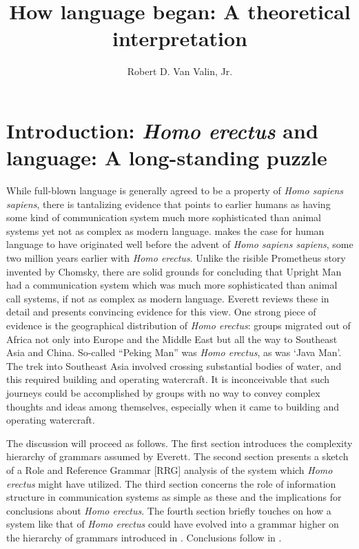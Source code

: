 \documentclass[output=paper,colorlinks,citecolor=brown]{langscibook}
\author{Robert D. Van Valin, Jr.\orcid{}\affiliation{The State University of New York at Buffalo \& Heinrich Heine University Düsseldorf}}
\title{How language began: A theoretical interpretation}
\begin{document}
\maketitle

\section{Introduction: \emph{Homo erectus} and language: A long-standing puzzle}
While full-blown language is generally agreed to be a property of \emph{Homo sapiens sapiens}, there is tantalizing evidence that points to earlier humans as having some kind of communication system much more sophisticated than animal systems yet not as complex as modern language. \citet{everett2017language} makes the case for human language to have originated well before the advent of \emph{Homo sapiens sapiens}, some two million years earlier with \emph{Homo erectus}. Unlike the risible Prometheus story invented by Chomsky, there are solid grounds for concluding that Upright Man had a communication system which was much more sophisticated than animal call systems, if not as complex as modern language.  Everett reviews these in detail and presents convincing evidence for this view.  One strong piece of evidence is the geographical distribution of \emph{Homo erectus}: groups migrated out of Africa not only into Europe and the Middle East but all the way to Southeast Asia and China.  So-called “Peking Man” was \emph{Homo erectus}, as was ‘Java Man’.  The trek into Southeast Asia involved crossing substantial bodies of water, and this required building and operating watercraft.  It is inconceivable that such journeys could be accomplished by groups with no way to convey complex thoughts and ideas among themselves, especially when it came to building and operating watercraft.  

The discussion will proceed as follows. The first section introduces the complexity hierarchy of grammars assumed by Everett.  The second section presents a sketch of a Role and Reference Grammar [RRG] \citep{van2005exploring,van1997syntax} analysis of the system which \emph{Homo erectus} might have utilized.  The third section concerns the role of information structure in communication systems as simple as these and the implications for conclusions about \emph{Homo erectus}.  The fourth section briefly touches on how a system like that of \emph{Homo erectus} could have evolved into a grammar higher on the hierarchy of grammars introduced in . Conclusions follow in .
\end{document}
